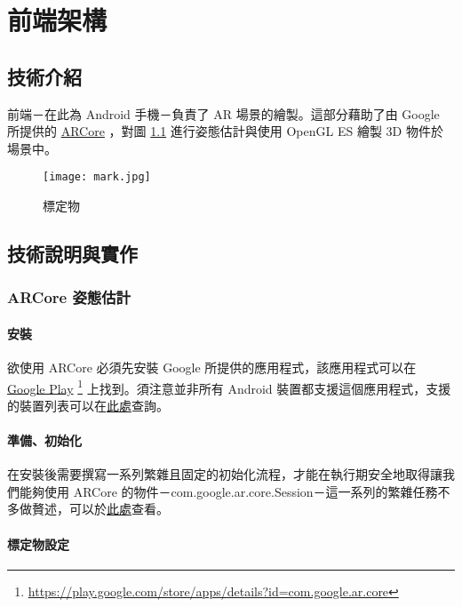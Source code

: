 \chapter{前端架構}
\section{技術介紹}

前端－在此為 Android 手機－負責了 AR 場景的繪製。這部分藉助了由 Google 所提供的 \href{https://developers.google.com/ar}{ARCore} ，對圖 \ref{fig:標定物} 進行姿態估計與使用 OpenGL ES 繪製 3D 物件於場景中。

\begin{figure}[h]
    \centering
    \texttt{[image: mark.jpg]}
    \caption{標定物}
    \label{fig:標定物}
\end{figure}

\section{技術說明與實作}
\subsection{ARCore 姿態估計}
\subsubsection{安裝}

欲使用 ARCore 必須先安裝 Google 所提供的應用程式，該應用程式可以在 \href{https://play.google.com/store/apps/details?id=com.google.ar.core}{Google Play} \footnote{\url{https://play.google.com/store/apps/details?id=com.google.ar.core}} 上找到。須注意並非所有 Android 裝置都支援這個應用程式，支援的裝置列表可以在\href{https://developers.google.com/ar/discover/supported-devices#google_play_device}{此處}查詢。

\subsubsection{準備、初始化}

在安裝後需要撰寫一系列繁雜且固定的初始化流程，才能在執行期安全地取得讓我們能夠使用 ARCore 的物件－com.google.ar.core.Session－這一系列的繁雜任務不多做贅述，可以於\href{https://developers.google.com/ar/develop/java/enable-arcore}{此處}查看。

\subsubsection{標定物設定}

